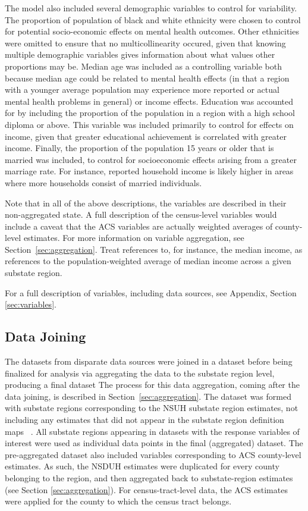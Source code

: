 \documentclass{article}
\begin{document}
The model also included several demographic variables to control for
variability.
The proportion of population of black and white ethnicity
were chosen to control for potential socio-economic
effects on mental health outcomes. Other ethnicities were omitted to
ensure that no multicollinearity occured, given that knowing
multiple demographic variables gives information about what values other
proportions may be.
Median age was included as a controlling variable
both because median age could be related to mental health effects (in
that a region with a younger average population may experience more
reported or actual mental health problems in general) or income effects.
Education was accounted for by including the proportion of the
population in a region with a high school diploma or above. This
variable was included primarily to control for effects on income, given
that greater educational achievement is correlated with greater income.
Finally, the proportion of the population 15 years or older that is
married was included, to control for socioeconomic effects arising from
a greater marriage rate. For instance, reported household income is
likely higher in areas where more households consist of married
individuals.

Note that in all of the above descriptions, the variables are described in their
non-aggregated state. A full description of the census-level variables would
include a caveat that the ACS variables are actually weighted averages of
county-level estimates. For more information on variable aggregation, see
Section~\ref{sec:aggregation}. Treat references to, for instance, the
median income, as references to the population-weighted average of
median income across a given substate region.

For a full description of variables, including data sources, see
Appendix, Section \ref{sec:variables}.

\subsection{Data Joining}\label{sec:joining}

The datasets from disparate data sources were joined
in a dataset before being finalized for analysis
via aggregating the data to the substate region level,
producing a final dataset
The process for this data aggregation, coming after
the data joining, is described in Section~\ref{sec:aggregation}.
The dataset was formed with substate regions corresponding to
the NSUH substate region estimates,
not including any estimates that did not appear in
the substate region definition maps
\cite{samhsa_data}~\cite{samhsa_substate_region_defs}.
All substate regions appearing in datasets with the response
variables of interest were used as individual data points in the
final (aggregated) dataset.
The pre-aggregated dataset also included variables
corresponding to ACS county-level estimates.
As such, the NSDUH estimates were duplicated
for every county belonging to the region,
and then aggregated back to substate-region estimates (see Section
\ref{sec:aggregation}).
For census-tract-level data, the ACS estimates
were applied for the county to which the census tract belongs.
\end{document}
